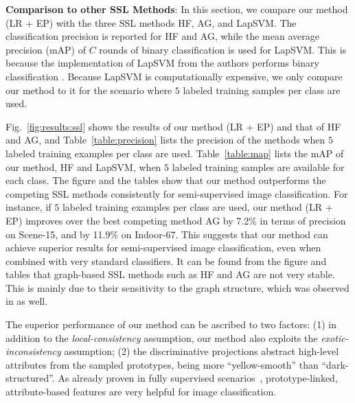 \textbf{Comparison to other SSL Methods}: In this section, we compare
our method (LR + EP) with the three SSL methods HF, AG, and LapSVM.
The classification precision is reported for HF and AG, while the mean average
precision (mAP) of $C$ rounds of binary classification is used for
LapSVM. This is because the implementation of LapSVM from the authors 
performs binary classification \citep{Belkin:semiframe:2006}. Because LapSVM is computationally
expensive, we only compare our method to it for the scenario where $5$
labeled training samples per class are used.

Fig.~\ref{fig:results:ssl} shows the results of our method (LR + EP)
and that of HF and AG, and Table~\ref{table:precision} lists the
precision of the methods when $5$ labeled training examples per class
are used. Table~\ref{table:map} lists the mAP of our method, HF and
LapSVM, when $5$ labeled training samples are available for each
class. The figure and the tables show that our method outperforms the
competing SSL methods consistently for semi-supervised image
classification.  For instance, if $5$ labeled training examples per
class are used, our method (LR + EP) improves over the best competing
method AG by 7.2\% in terms of precision on Scene-15, and by 11.9\% on
Indoor-67. This suggests that our method can achieve superior results
for semi-supervised image classification, even when combined with very
standard classifiers. It can be found from the figure and tables that
graph-based SSL methods such as HF and AG are not very stable. This is
mainly due to their sensitivity to the graph structure, which was
observed in \citep{nips14:ssl} as well.


The superior performance of our method can be ascribed to two factors: (1) in addition to the
\emph{local-consistency} assumption, our method also exploits the
\emph{exotic-inconsistency} assumption; (2) the discriminative
projections abstract high-level attributes from the sampled
prototypes, \eg being more ``yellow-smooth'' than
``dark-structured''.  As already proven in fully supervised
scenarios~\citep{ObjectAttribute:cvpr09, Transfer:CVPR:08},
prototype-linked, attribute-based features are very helpful for image
classification.  

